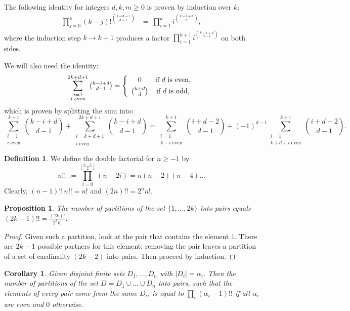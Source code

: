 \documentclass{amsart}
\newcommand{\coloneqq}{:=}
\theoremstyle{plain}
\newtheorem{proposition}[theorem]{Proposition}
\newtheorem{corollary}[theorem]{Corollary}
\theoremstyle{definition}
\newtheorem{definition}[theorem]{Definition}
\theoremstyle{remark}
\begin{document}
The following identity for integers $d,k,m\geq 0$ is proven by induction over $k$:
\begin{align} \label{facprod1}
\prod_{j=0}^k (k-j)!^{\binom{j+d-1}{d-1}} &= \ \prod_{i=1}^k i^{\binom{k-i+d}{d}},
\end{align}
where the induction step $k\rightarrow k+1$ produces a factor $\prod\limits_{i=1}^{k+1} i^{\binom{k-i+d}{d-1} }$ on both sides.

We will also need the identity:
\begin{equation} \label{evensum}
\sum_{\substack{i=1\\i\text{ even}}}^{2k+d+1}\textstyle \binom{k-i+d}{d-1} = \left\{ 
 \begin{array}{*2{c}p{5cm}}0 &\text{if }d\text{ is even}, \vspace{1mm}\\
 \binom{k+d}{d} &\text{if }d\text{ is odd},
\end{array}\right.
\end{equation}
which is proven by splitting the sum into:
$$
\sum_{\substack{i=1\\i\text{ even}}}^{k+1} \textstyle\binom{k-i+d}{d-1} + \displaystyle\sum_{\substack{i=k+d+1\\i\text{ even}}}^{2k+d+1}\textstyle \binom{k-i+d}{d-1}
= \displaystyle\sum_{\substack{i=1\\k-i\text{ even}}}^{k+1}\!\! \textstyle\binom{i+d-2}{d-1} +(-1)^{d-1} \!\!\!\!
 \displaystyle\sum_{\substack{i=1\\k+d+i\text{ even}}}^{k+1} \!\!\!\! \textstyle\binom{i+d-2}{d-1} .
$$

\begin{definition}\label{doublefactorial}
We define the double factorial for $ n\geq -1$ by 
$$n!! \,\coloneqq \prod_{i=0}^{\left\lfloor\!\frac{n-1}{2}\!\right\rfloor }(n-2i)=n(n-2)(n-4)\ldots $$
Clearly, $(n-1)!!\,n!! = n!$ and $(2n)!! = 2^n n!$.
\end{definition}
\begin{proposition} \label{partitioncount}
The number of partitions of the set $\{1,\ldots,2k\}$ into pairs equals $(2k-1)!! = \frac{(2k)!}{2^kk!}$.
\end{proposition}
\begin{proof}
Given such a partition, look at the pair that contains the element $1$. There are $2k-1$ possible partners for this element; removing the pair leaves a partition of a set of cardinality $(2k-2)$ into pairs. Then proceed by induction.
\end{proof}
\begin{corollary} \label{multipairs}
Given disjoint finite sets $D_1,\ldots,D_n$ with $|D_i|=\alpha_i$. Then the number of partitions of the set $D = D_1\cup\ldots\cup D_n$ into pairs, such that the elements of every pair come from the same $D_i$, is equal to $\prod_i (\alpha_i -1)!!$ if all $\alpha_i$ are even and $0$ otherwise.
\end{corollary}
\end{document}
